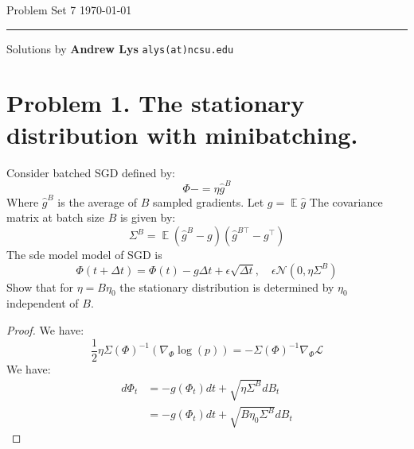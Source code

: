 \documentclass{amsart}
\newcommand{\cN}{\mathcal{N}}
\newcommand{\cL}{\mathcal{L}}
\DeclareMathOperator{\ee}{\mathbb{E}}
\theoremstyle{definition}
\begin{document}
\noindent
Problem Set 7  \hfill \today  %
\smallskip
\hrule
\smallskip
\noindent
Solutions by {\bf Andrew Lys} \qquad   %
  {\tt alys(at)ncsu.edu}

\vspace{0.5cm}

\section*{Problem 1. The stationary distribution with minibatching.}
Consider batched SGD defined by:
\[
\Phi -= \eta \hat{g}^B
\]
Where $\hat{g}^B$ is the average of $B$ sampled gradients. 
Let $g = \ee{\hat{g}}$
The covariance matrix at batch size $B$ is given by:
\[
\Sigma^B = \ee{(\hat{g}^B - g)(\hat{g}^{B\top} - g^\top)}
\]
The sde model model of SGD is 
\[
\Phi(t + \Delta t) = \Phi(t) - g\Delta t + \epsilon \sqrt{\Delta t}, \quad \epsilon \cN(0, \eta \Sigma^B)
\]
Show that for $\eta = B \eta_0$ the stationary distribution is determined by $\eta_0$ independent of $B$. 
\begin{proof}
    We have:
    \[
    \frac{1}{2}\eta \Sigma(\Phi)^{-1}(\nabla_\Phi \log(p)) = - \Sigma(\Phi)^{-1} \nabla_\Phi \cL
    \]
    We have:
    \begin{align*}
        d \Phi_t &= -g (\Phi_t) dt + \sqrt{\eta \Sigma^B} dB_t\\
        &= -g (\Phi_t) dt + \sqrt{B \eta_0 \Sigma^B} dB_t
    \end{align*}
\end{proof}
\end{document}
